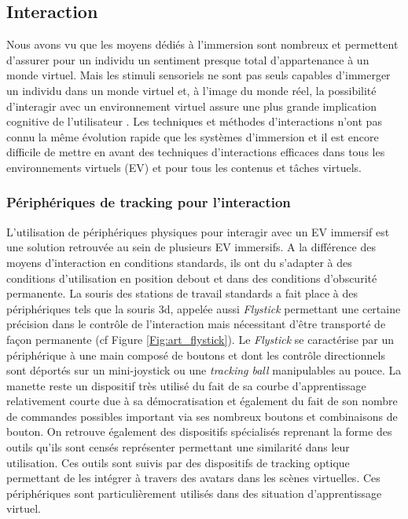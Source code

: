 \subsection{Interaction}

Nous avons vu que les moyens dédiés à l'immersion sont nombreux et permettent d'assurer pour un individu un sentiment presque total d'appartenance à un monde virtuel.
Mais les stimuli sensoriels ne sont pas seuls capables d'immerger un individu dans un monde virtuel et, à l'image du monde réel, la possibilité d'interagir avec un environnement virtuel assure une plus grande implication cognitive de l'utilisateur \cite{steuer1995defining}. Les techniques et méthodes d'interactions n'ont pas connu la même évolution rapide que les systèmes d'immersion et il est encore difficile de mettre en avant des techniques d'interactions efficaces dans tous les environnements virtuels (EV) et pour tous les contenus et tâches virtuels.

\subsubsection{Périphériques de tracking pour l'interaction} \label{peripheriques}

L'utilisation de périphériques physiques pour interagir avec un EV immersif est une solution retrouvée au sein de plusieurs EV immersifs. A la différence des moyens d'interaction en conditions standards, ils ont du s'adapter à des conditions d'utilisation en position debout et dans des conditions d'obscurité permanente. La souris des stations de travail standards a fait place à des périphériques tels que la souris 3d, appelée aussi \textit{Flystick} permettant une certaine précision dans le contrôle de l'interaction mais nécessitant d'être transporté de façon permanente (cf Figure \ref{Fig:art_flystick}). Le \textit{Flystick} se caractérise par un périphérique à une main composé de boutons et dont les contrôle directionnels sont déportés sur un mini-joystick ou une \textit{tracking ball} manipulables au pouce. La manette reste un dispositif très utilisé du fait de sa courbe d'apprentissage relativement courte due à sa démocratisation et également du fait de son nombre de commandes possibles important via ses nombreux boutons et combinaisons de bouton.
On retrouve également des dispositifs spécialisés reprenant la forme des outils qu'ils sont censés représenter permettant une similarité dans leur utilisation. Ces outils sont suivis par des dispositifs de tracking optique permettant de les intégrer à travers des avatars dans les scènes virtuelles. Ces périphériques sont particulièrement utilisés dans des situation d'apprentissage virtuel.

